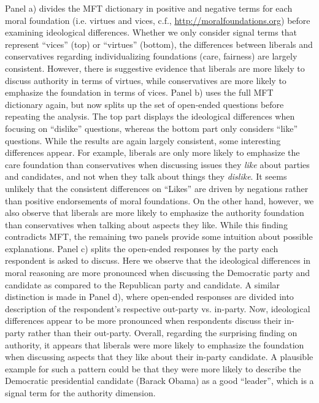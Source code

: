 \documentclass[12pt]{article}
\begin{document}
Panel a) divides the MFT dictionary in positive and negative terms for each moral foundation (i.e. virtues and vices, c.f., \url{http://moralfoundations.org}) before examining ideological differences. Whether we only consider signal terms that represent ``vices'' (top) or ``virtues'' (bottom), the differences between liberals and conservatives regarding individualizing foundations (care, fairness) are largely consistent. However, there is suggestive evidence that liberals are more likely to discuss authority in terms of virtues, while conservatives are more likely to emphasize the foundation in terms of vices. Panel b) uses the full MFT dictionary again, but now splits up the set of open-ended questions before repeating the analysis. The top part displays the ideological differences when focusing on ``dislike'' questions, whereas the bottom part only considers ``like'' questions. While the results are again largely consistent, some interesting differences appear. For example, liberals are only more likely to emphasize the care foundation than conservatives when discussing issues they \textit{like} about parties and candidates, and not when they talk about things they \textit{dislike}. It seems unlikely that the consistent differences on ``Likes'' are driven by negations rather than positive endorsements of moral foundations. On the other hand, however, we also observe that liberals are more likely to emphasize the authority foundation than conservatives when talking about aspects they like. While this finding contradicts MFT, the remaining two panels provide some intuition about possible explanations. Panel c) splits the open-ended responses by the party each respondent is asked to discuss. Here we observe that the ideological differences in moral reasoning are more pronounced when discussing the Democratic party and candidate as compared to the Republican party and candidate. A similar distinction is made in Panel d), where open-ended responses are divided into description of the respondent's respective out-party vs. in-party. Now, ideological differences appear to be more pronounced when respondents discuss their in-party rather than their out-party. Overall, regarding the surprising finding on authority, it appears that liberals were more likely to emphasize the foundation when discussing aspects that they like about their in-party candidate. A plausible example for such a pattern could be that they were more likely to describe the Democratic presidential candidate (Barack Obama) as a good ``leader'', which is a signal term for the authority dimension.
\end{document}
